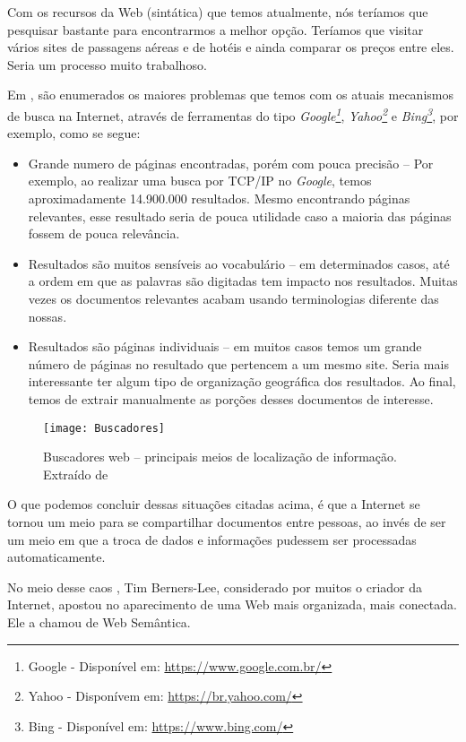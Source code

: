 Com os recursos da  Web (sintática) que temos atualmente, nós teríamos que pesquisar bastante para encontrarmos a melhor opção. Teríamos que visitar vários sites de passagens aéreas e de hotéis e ainda comparar os preços entre eles. Seria um processo muito trabalhoso.

Em \cite{kbreitman}, são enumerados os maiores problemas que temos com os atuais mecanismos de busca na Internet, através de ferramentas do tipo \emph{Google\footnote{Google - Disponível em: \url{https://www.google.com.br/} }}, \emph{Yahoo\footnote{Yahoo - Disponívem em: \url{https://br.yahoo.com/}}} e \emph{Bing\footnote{Bing - Disponível em: \url{https://www.bing.com/}}}, por exemplo, como se segue:

\begin{itemize}
\item Grande numero de páginas encontradas, porém com pouca precisão – Por exemplo, ao realizar uma busca por TCP/IP no \emph{Google}, temos aproximadamente 14.900.000 resultados. Mesmo encontrando páginas relevantes, esse resultado seria de pouca utilidade caso a maioria das páginas fossem de pouca relevância.
\item Resultados são muitos sensíveis ao vocabulário – em determinados casos, até a ordem em que as palavras são digitadas tem impacto nos resultados. Muitas vezes os documentos relevantes acabam usando terminologias diferente das nossas.
\item Resultados são páginas individuais – em muitos casos temos um grande número de páginas no resultado que pertencem a um mesmo site. Seria mais interessante ter algum tipo de organização geográfica dos resultados. Ao final, temos de extrair manualmente as porções desses documentos de interesse.
\end{itemize}

\graphicspath{{figuras/}}
\begin{figure}[H]
\centering
\texttt{[image: Buscadores]}
\caption[Buscadores web – principais meios de localização de informação.]{Buscadores web – principais meios de localização de informação. Extraído de \cite{intwebsem} }
\label{buscadores}
\end{figure}
O que podemos concluir dessas situações citadas acima, é que a Internet se tornou um meio para se compartilhar documentos entre pessoas, ao invés de ser um meio em que a troca de dados e informações pudessem ser processadas automaticamente.

No meio desse caos , Tim Berners-Lee, considerado por muitos o criador da Internet, apostou no aparecimento de uma Web mais organizada, mais conectada. Ele a chamou de Web Semântica.


